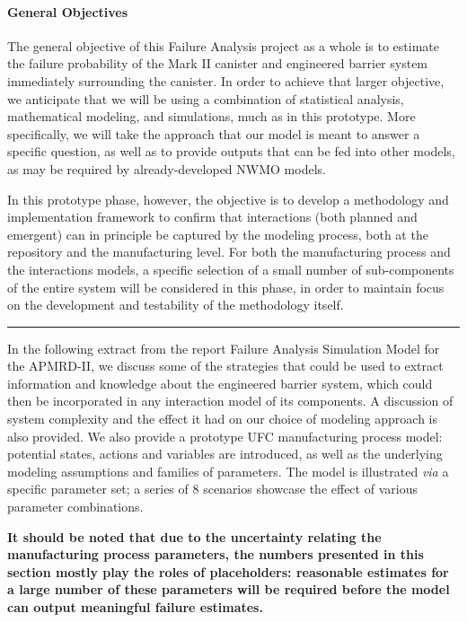 \paragraph{General Objectives}
The general objective of this Failure Analysis project as a whole is to estimate the failure probability of the Mark II canister and engineered barrier system immediately surrounding the canister. In order to achieve that larger objective, we anticipate that we will be using a combination of statistical analysis, mathematical modeling, and simulations, much as in this prototype. More specifically, we will take the approach that our model is meant to answer a specific question, as well as to provide outputs that can be fed into other models, as may be required by already-developed NWMO models.
\par In this prototype phase, however, the objective is to develop a methodology and implementation framework to confirm that interactions (both planned and emergent) can in principle be captured by the modeling process, both at the repository and the manufacturing level. For both the manufacturing process and the interactions models, a  specific selection of a small number of sub-components of the entire system will be considered in this phase, in order to maintain focus on the development and testability of the methodology itself.  
\begin{center}\rule{0.5\linewidth}{.4pt}\end{center}
In the following extract from the report Failure Analysis Simulation Model for the APMRD-II, we discuss some of the strategies that could be used to extract information and knowledge about the engineered barrier system, which could then be incorporated in any interaction model of its components. A discussion of system complexity and the effect it had on our choice of modeling approach is also provided. We also provide a prototype UFC manufacturing process model: potential states, actions and variables are introduced, as well as the underlying modeling assumptions and families of parameters. The model is illustrated \textit{via} a specific parameter set; a series of 8 scenarios showcase the effect of various parameter combinations. \par \textbf{It should be noted that due to the uncertainty relating the manufacturing process parameters, the numbers presented in this section mostly play the roles of placeholders: reasonable estimates for a large number of these parameters will be required before the model can output meaningful failure estimates.}     

